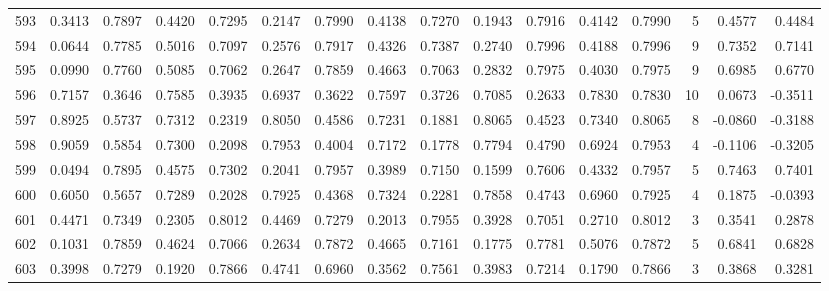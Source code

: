 \begin{tabular}{lrrrrrrrrrrrrrrr}
593 &      0.3413 &  0.7897 &  0.4420 &  0.7295 &  0.2147 &  0.7990 &  0.4138 &  0.7270 &  0.1943 &  0.7916 &   0.4142 &     0.7990 &      5 &                    0.4577 &                     0.4484 \\
594 &      0.0644 &  0.7785 &  0.5016 &  0.7097 &  0.2576 &  0.7917 &  0.4326 &  0.7387 &  0.2740 &  0.7996 &   0.4188 &     0.7996 &      9 &                    0.7352 &                     0.7141 \\
595 &      0.0990 &  0.7760 &  0.5085 &  0.7062 &  0.2647 &  0.7859 &  0.4663 &  0.7063 &  0.2832 &  0.7975 &   0.4030 &     0.7975 &      9 &                    0.6985 &                     0.6770 \\
596 &      0.7157 &  0.3646 &  0.7585 &  0.3935 &  0.6937 &  0.3622 &  0.7597 &  0.3726 &  0.7085 &  0.2633 &   0.7830 &     0.7830 &     10 &                    0.0673 &                    -0.3511 \\
597 &      0.8925 &  0.5737 &  0.7312 &  0.2319 &  0.8050 &  0.4586 &  0.7231 &  0.1881 &  0.8065 &  0.4523 &   0.7340 &     0.8065 &      8 &                   -0.0860 &                    -0.3188 \\
598 &      0.9059 &  0.5854 &  0.7300 &  0.2098 &  0.7953 &  0.4004 &  0.7172 &  0.1778 &  0.7794 &  0.4790 &   0.6924 &     0.7953 &      4 &                   -0.1106 &                    -0.3205 \\
599 &      0.0494 &  0.7895 &  0.4575 &  0.7302 &  0.2041 &  0.7957 &  0.3989 &  0.7150 &  0.1599 &  0.7606 &   0.4332 &     0.7957 &      5 &                    0.7463 &                     0.7401 \\
600 &      0.6050 &  0.5657 &  0.7289 &  0.2028 &  0.7925 &  0.4368 &  0.7324 &  0.2281 &  0.7858 &  0.4743 &   0.6960 &     0.7925 &      4 &                    0.1875 &                    -0.0393 \\
601 &      0.4471 &  0.7349 &  0.2305 &  0.8012 &  0.4469 &  0.7279 &  0.2013 &  0.7955 &  0.3928 &  0.7051 &   0.2710 &     0.8012 &      3 &                    0.3541 &                     0.2878 \\
602 &      0.1031 &  0.7859 &  0.4624 &  0.7066 &  0.2634 &  0.7872 &  0.4665 &  0.7161 &  0.1775 &  0.7781 &   0.5076 &     0.7872 &      5 &                    0.6841 &                     0.6828 \\
603 &      0.3998 &  0.7279 &  0.1920 &  0.7866 &  0.4741 &  0.6960 &  0.3562 &  0.7561 &  0.3983 &  0.7214 &   0.1790 &     0.7866 &      3 &                    0.3868 &                     0.3281 \\

\end{tabular}
